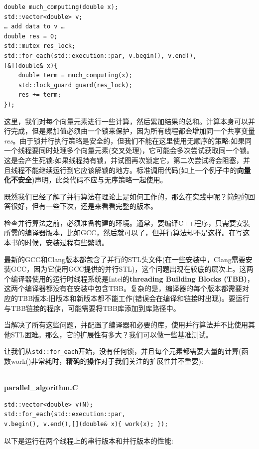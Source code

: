 \begin{lstlisting}[style=styleCXX]
double much_computing(double x);
std::vector<double> v;
… add data to v … 
double res = 0;
std::mutex res_lock;
std::for_each(std::execution::par, v.begin(), v.end(),
[&](double& x){ 
	double term = much_computing(x);
	std::lock_guard guard(res_lock);
	res += term;
});
\end{lstlisting}

这里，我们对每个向量元素进行一些计算，然后累加结果的总和。计算本身可以并行完成，但是累加值必须由一个锁来保护，因为所有线程都会增加同一个共享变量\textit{res}。由于锁并行执行策略是安全的，但我们不能在这里使用无顺序的策略:如果同一个线程要同时处理多个向量元素(交叉处理)，它可能会多次尝试获取同一个锁。这是会产生死锁:如果线程持有锁，并试图再次锁定它，第二次尝试将会阻塞，并且线程不能继续运行到它应该解锁的地方。标准调用代码(如上一个例子中的\textbf{向量化不安全})声明，此类代码不应与无序策略一起使用。 

既然我们已经了解了并行算法在理论上是如何工作的，那么在实践中呢？简短的回答很好，但有一些下次，还是来看看完整的版本。

检查并行算法之前，必须准备构建的环境。通常，要编译C++程序，只需要安装所需的编译器版本，比如GCC，然后就可以了，但并行算法却不是这样。在写这本书的时候，安装过程有些繁琐。

最新的GCC和Clang版本都包含了并行的STL头文件(在一些安装中，Clang需要安装GCC，因为它使用GCC提供的并行STL)，这个问题出现在较底的层次上。这两个编译器使用的运行时线程系统是Intel的\textbf{threading Building Blocks (TBB)}，这两个编译器都没有在安装中包含TBB。复杂的是，编译器的每个版本都需要对应的TBB版本:旧版本和新版本都不能工作(错误会在编译和链接时出现)。要运行与TBB链接的程序，可能需要将TBB库添加到库路径中。

当解决了所有这些问题，并配置了编译器和必要的库，使用并行算法并不比使用其他STL困难。那么，它的扩展性有多大？我们可以做一些基准测试。 

让我们从\texttt{std::for\_each}开始，没有任何锁，并且每个元素都需要大量的计算(函数work()非常耗时，精确的操作对于我们关注的扩展性并不重要):

\hspace*{\fill} \\ %
\noindent
\textbf{parallel\_algorithm.C}
\begin{lstlisting}[style=styleCXX]
std::vector<double> v(N);
std::for_each(std::execution::par,
v.begin(), v.end(),[](double& x){ work(x); });
\end{lstlisting}

以下是运行在两个线程上的串行版本和并行版本的性能:

